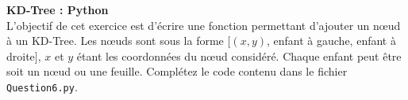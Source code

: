 \begin{Exercice}[10 minutes]


\end{Exercice}


\begin{Exercice}[15 minutes]\textbf{KD-Tree : Python}\\

L'objectif de cet exercice est d'écrire une fonction permettant d'ajouter un nœud à un KD-Tree. Les nœuds sont sous la forme $[(x,y)$, enfant à gauche, enfant à droite$]$, $x$ et $y$ étant les coordonnées du nœud considéré. Chaque enfant peut être soit un nœud ou une feuille. Complétez le code contenu dans le fichier \lstinline{Question6.py}. \newline 


\end{Exercice}
